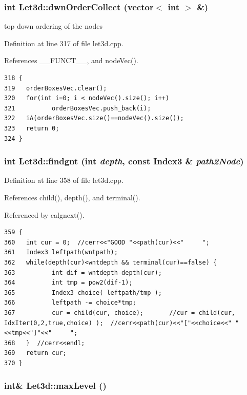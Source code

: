 \subsubsection{\setlength{\rightskip}{0pt plus 5cm}int Let3d::dwn\-Order\-Collect (vector$<$ int $>$ \&)}\label{classLet3d_1917ece529ea97f12e74e56e42b6d15a_1917ece529ea97f12e74e56e42b6d15a}


top down ordering of the nodes 

Definition at line 317 of file let3d.cpp.

References \_\-\_\-FUNCT\_\-\_\-, and node\-Vec().

\footnotesize\begin{verbatim}318 {
319   orderBoxesVec.clear();
320   for(int i=0; i < nodeVec().size(); i++)
321          orderBoxesVec.push_back(i);
322   iA(orderBoxesVec.size()==nodeVec().size());
323   return 0;
324 }
\end{verbatim}\normalsize 


\subsubsection{\setlength{\rightskip}{0pt plus 5cm}int Let3d::findgnt (int {\em depth}, const Index3 \& {\em path2Node})}\label{classLet3d_dadf07c3ca29b244d01e8570e2846a2c_dadf07c3ca29b244d01e8570e2846a2c}




Definition at line 358 of file let3d.cpp.

References child(), depth(), and terminal().

Referenced by calgnext().

\footnotesize\begin{verbatim}359 {
360   int cur = 0;  //cerr<<"GOOD "<<path(cur)<<"     ";
361   Index3 leftpath(wntpath);
362   while(depth(cur)<wntdepth && terminal(cur)==false) {
363          int dif = wntdepth-depth(cur);
364          int tmp = pow2(dif-1);
365          Index3 choice( leftpath/tmp );
366          leftpath -= choice*tmp;
367          cur = child(cur, choice);       //cur = child(cur, IdxIter(0,2,true,choice) );  //cerr<<path(cur)<<"["<<choice<<" "<<tmp<<"]"<<"     ";
368   }  //cerr<<endl;
369   return cur;
370 }
\end{verbatim}\normalsize 


\subsubsection{\setlength{\rightskip}{0pt plus 5cm}int\& Let3d::max\-Level ()\hspace{0.3cm}{\tt  [inline]}}\label{classLet3d_fdc3ca03e415e2d7b0b1f708d3ab94bb_fdc3ca03e415e2d7b0b1f708d3ab94bb}




